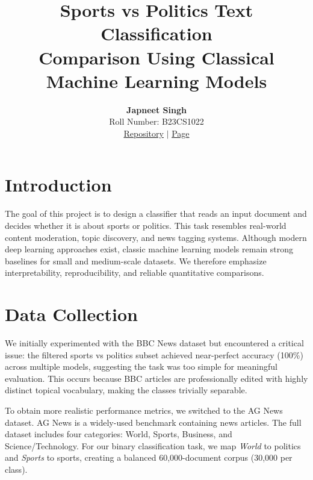 \documentclass[12pt]{article}
\title{
\vspace{-1.5cm}
\textbf{\Huge Sports vs Politics Text Classification}\\[0.5em]
\large  Comparison Using Classical Machine Learning Models
}
\author{
\textbf{Japneet Singh}\\
Roll Number: B23CS1022\\
\vspace{0.5em}
\small
\href{https://github.com/japneet1234/NLU_Problem4}{Repository} $\mid$ 
\href{https://japneet1234.github.io/NLU_Problem4/}{Page}
}
\date{}
\begin{document}
\maketitle
\onehalfspacing


\section{Introduction}
The goal of this project is to design a classifier that reads an input document and decides whether it is about sports or politics. This task resembles real-world content moderation, topic discovery, and news tagging systems. Although modern deep learning approaches exist, classic machine learning models remain strong baselines for small and medium-scale datasets. We therefore emphasize interpretability, reproducibility, and reliable quantitative comparisons.

\section{Data Collection}
We initially experimented with the BBC News dataset but encountered a critical issue: the filtered sports vs politics subset achieved near-perfect accuracy (100\%) across multiple models, suggesting the task was too simple for meaningful evaluation. This occurs because BBC articles are professionally edited with highly distinct topical vocabulary, making the classes trivially separable.

To obtain more realistic performance metrics, we switched to the AG News dataset. AG News is a widely-used benchmark containing news articles. The full dataset includes four categories: World, Sports, Business, and Science/Technology. For our binary classification task, we map \textit{World} to politics and \textit{Sports} to sports, creating a balanced 60,000-document corpus (30,000 per class).
\end{document}
